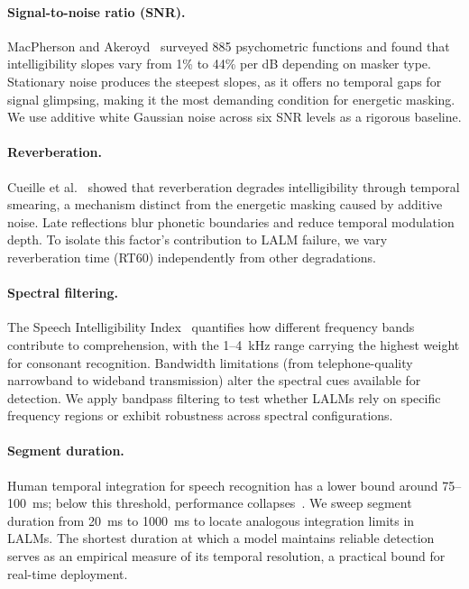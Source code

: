 \documentclass[11pt,a4paper]{article}
\begin{document}
\paragraph{Signal-to-noise ratio (SNR).} MacPherson and Akeroyd~\cite{macpherson2014variations} surveyed 885 psychometric functions and found that intelligibility slopes vary from 1\% to 44\% per dB depending on masker type. Stationary noise produces the steepest slopes, as it offers no temporal gaps for signal glimpsing, making it the most demanding condition for energetic masking. We use additive white Gaussian noise across six SNR levels as a rigorous baseline.

\paragraph{Reverberation.} Cueille et al.~\cite{cueille2022effects} showed that reverberation degrades intelligibility through temporal smearing, a mechanism distinct from the energetic masking caused by additive noise. Late reflections blur phonetic boundaries and reduce temporal modulation depth. To isolate this factor's contribution to LALM failure, we vary reverberation time (RT60) independently from other degradations.

\paragraph{Spectral filtering.} The Speech Intelligibility Index~\cite{studebaker1987articulation} quantifies how different frequency bands contribute to comprehension, with the 1--4~kHz range carrying the highest weight for consonant recognition. Bandwidth limitations (from telephone-quality narrowband to wideband transmission) alter the spectral cues available for detection. We apply bandpass filtering to test whether LALMs rely on specific frequency regions or exhibit robustness across spectral configurations.

\paragraph{Segment duration.} Human temporal integration for speech recognition has a lower bound around 75--100~ms; below this threshold, performance collapses~\cite{kocinski2016time}. We sweep segment duration from 20~ms to 1000~ms to locate analogous integration limits in LALMs. The shortest duration at which a model maintains reliable detection serves as an empirical measure of its temporal resolution, a practical bound for real-time deployment.
\end{document}
